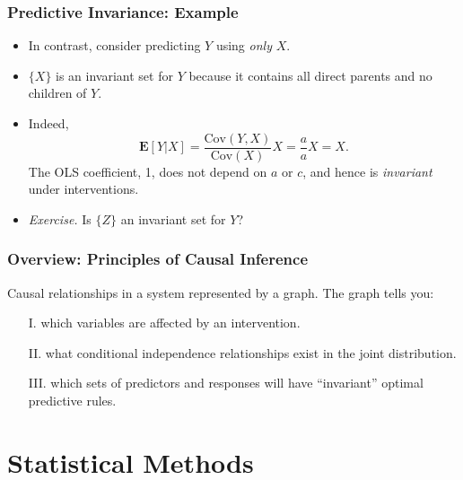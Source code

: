 \documentclass{beamer}
\newcommand{\E}{\textbf{E}}
\newcommand{\Cov}{\text{Cov}}
\begin{document}
\begin{frame}
\frametitle{Predictive Invariance: Example}
\begin{center}
\end{center}
\begin{itemize}
\item In contrast, consider predicting $Y$ using \emph{only} $X$.
\item $\{X\}$ is an invariant set for $Y$ because it contains all direct parents and no children of $Y$.
\item Indeed,
\[
\E[Y|X] = \frac{\Cov(Y, X)}{\Cov(X)} X = \frac{a}{a} X = X.
\]
The OLS coefficient, 1, does not depend on $a$ or $c$, and hence is \emph{invariant} under interventions.
\item \emph{Exercise.} Is $\{Z\}$ an invariant set for $Y$?
\end{itemize}
\end{frame}




\begin{frame}
\frametitle{Overview: Principles of Causal Inference}
Causal relationships in a system represented by a graph.  The graph tells you:
\begin{itemize}
\item[I.] which variables are affected by an intervention.
\item[II.] what conditional independence relationships exist in the joint distribution.
\item[III.] which sets of predictors and responses will have ``invariant'' optimal predictive rules.
\end{itemize}
\end{frame}

\section{Statistical Methods}

\begin{frame}
\sectionpage
\end{frame}
\end{document}
